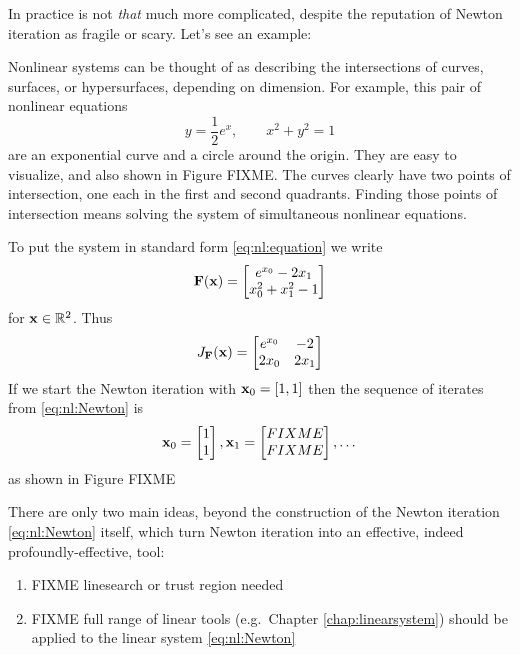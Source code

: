 In practice is not \emph{that} much more complicated, despite the reputation of Newton iteration as fragile or scary.  Let's see an example:

\medskip\noindent\hrulefill
\begin{example}  Nonlinear systems can be thought of as describing the intersections of curves, surfaces, or hypersurfaces, depending on dimension.  For example, this pair of nonlinear equations
    $$y = \frac{1}{2} e^x, \qquad x^2+y^2 = 1$$
are an exponential curve and a circle around the origin.  They are easy to visualize, and also shown in Figure FIXME.  The curves clearly have two points of intersection, one each in the first and second quadrants.  Finding those points of intersection means solving the system of simultaneous nonlinear equations.

To put the system in standard form \eqref{eq:nl:equation} we write
\begin{equation}
\mathbf{F}(\mathbf{x}) = \begin{bmatrix}
           e^{x_0} - 2 x_1 \\
           x_0^2 + x_1^2 - 1
           \end{bmatrix}
\end{equation}
for $\mathbf{x}\in \mathbb{R}^2$.  Thus
\begin{equation}
J_{\mathbf{F}}(\mathbf{x}) = \begin{bmatrix}
    e^{x_0} & -2 \\
    2 x_0   & 2 x_1 \end{bmatrix}
\end{equation}
If we start the Newton iteration with $\mathbf{x}_0 = [1,1]$ then the sequence of iterates from \eqref{eq:nl:Newton} is
    $${\mathbf{x}}_{0} = \begin{bmatrix} 1 \\ 1 \end{bmatrix}, {\mathbf{x}}_{1} = \begin{bmatrix} FIXME \\ FIXME \end{bmatrix}, \dots$$
as shown in Figure FIXME
\end{example}
\noindent\hrulefill

\medskip
There are only two main ideas, beyond the construction of the Newton iteration \eqref{eq:nl:Newton} itself, which turn Newton iteration into an effective, indeed profoundly-effective, tool:
\renewcommand{\labelenumi}{\roman{enumi})}
\begin{enumerate}
\item FIXME linesearch or trust region needed \citep{Kelley2003}
\item FIXME full range of linear tools (e.g.~Chapter \ref{chap:linearsystem}) should be applied to the linear system \eqref{eq:nl:Newton}
\end{enumerate}

